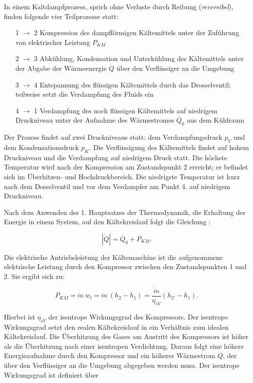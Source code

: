 In einem  Kaltdampfprozess, sprich ohne Verluste durch Reibung (\textit{reversibel}), finden folgende vier Teilprozesse statt:

\begin{itemize}
\item[1 $\longrightarrow$ 2] Kompression des dampfförmigen Kältemittels unter der Zuführung von elektrischer Leistung $P_{KM}$
\item[2 $\longrightarrow$ 3] Abkühlung, Kondensation und Unterkühlung des Kältemittels unter der Abgabe der Wärmeenergie $\dot{Q}$ über den Verflüssiger an die Umgebung
\item[3 $\longrightarrow$ 4] Entspannung des flüssigen Kältemittels durch das Drosselventil; teilweise setzt die Verdampfung des Fluids ein 
\item[4 $\longrightarrow$ 1] Verdampfung des noch flüssigen Kältemittels auf niedrigem Druckniveau unter der Aufnahme des Wärmestromes $\dot{Q_0}$ aus dem Kühlraum
\end{itemize}

Der Prozess findet auf zwei Druckniveaus statt: dem Verdampfungsdruck $p_V$ und dem Kondensationsdruck $p_K$. Die Verflüssigung des Kältemittels findet auf hohem Druckniveau und die Verdampfung auf niedrigem Druck statt. Die höchste Temperatur wird nach der Kompression am Zustandspunkt 2 erreicht; er befindet sich im Überhitzen- und Hochdruckbereich. Die niedrigste Temperatur ist kurz nach dem Dosselventil und vor dem Verdampfer am Punkt 4. auf niedrigem Druckniveau. 

Nach dem Anwenden des 1. Hauptsatzes der Thermodynamik, die Erhaltung der Energie in einem System, auf den Kältekreislauf folgt die Gleichung :

 \begin{equation}
 	|\dot{Q}|  = \dot{Q_0} +  P_{KM}.
 	\label{eq:Energiebilanz}
 \end{equation}
 
Die elektrische Antriebsleistung der Kältemaschine ist die aufgenommene elektrische Leistung durch den Kompressor zwischen den Zustandspunkten 1  und 2. Sie ergibt sich zu:

\begin{equation}
P_{KM} = \dot{m}~ w_t= \dot{m}~ (h_2 - h_1) = \frac{\dot{m} }{\eta_{sV}} (h_{2'}- h_1).
\label{eq:Antriebsleistung}
\end{equation}

Hierbei ist $\eta_{sV}$ der isentrope Wirkungsgrad des Kompressors. Der isentrope Wirkungsgrad setzt den realen Kältekreislauf in ein Verhältnis zum idealen Kältekreislauf. Die Überhitzung des Gases am Austritt des Kompressors ist höher als die Überhitzung nach einer isentropen Verdichtung. Daraus folgt eine höhere Energieaufnahme durch den Kompressor und ein höherer Wärmestrom $\dot{Q}$, der über den Verflüssiger an die Umgebung abgegeben werden muss. Der isentrope Wirkungsgrad ist definiert über 

